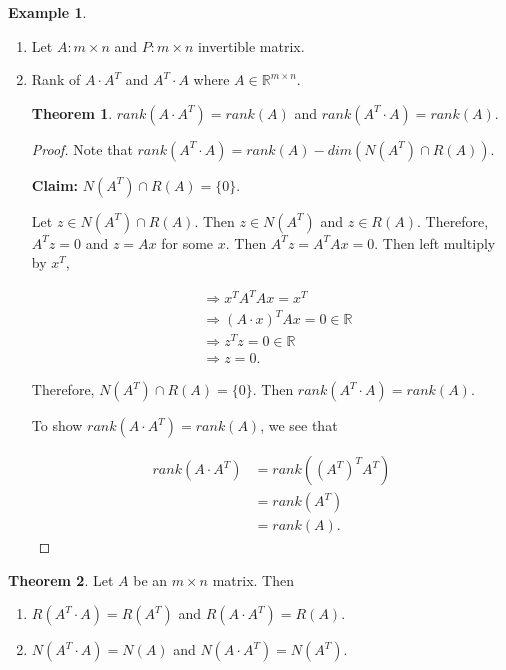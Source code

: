 \documentclass[12pt]{article}
\theoremstyle{definition}
\newtheorem*{example}{Example}
\newtheorem{theorem}{Theorem}[section]  %
\begin{document}
\begin{example} $ $
\begin{enumerate}[label = (\arabic*)]
\item Let $A: m \times n$ and $P: m \times n$ invertible matrix.


\item Rank of $A \cdot A^T$ and $A^T \cdot A$ where $A \in \mathbb{R}^{m \times n}$.

\begin{theorem}
$rank(A \cdot A^T) = rank(A)$ and $rank(A^T \cdot A) = rank(A)$.
\end{theorem}

\begin{proof}
Note that $rank(A^T \cdot A) = rank(A) - dim(N(A^T) \cap R(A))$.

\textbf{Claim:} $N(A^T) \cap R(A) = \{0\}$.

Let $z \in N(A^T) \cap R(A)$. Then $z \in N(A^T)$ and $z \in R(A)$. Therefore,
$A^Tz = 0$ and $z = Ax$ for some $x$. Then $A^T z = A^T Ax = 0$. Then left 
multiply by $x^T$,


\begin{align*}
&\Rightarrow x^T A^T A x = x^T \\
&\Rightarrow (A \cdot x)^T A x = 0 \in \mathbb{R} \\
&\Rightarrow z^Tz = 0 \in \mathbb{R} \\
&\Rightarrow z = 0.
\end{align*}

Therefore, $N(A^T) \cap R(A) = \{0\}$. Then $rank(A^T \cdot A) = rank(A)$.

To show $rank(A \cdot A^T) = rank(A)$, we see that

\begin{align*}
rank(A \cdot A^T) &= rank((A^T)^T A^T) \\
&= rank(A^T) \\
&= rank(A).
\end{align*}
\end{proof}

\end{enumerate}
\end{example}


\begin{theorem}
Let $A$ be an $m \times n$ matrix. Then

\begin{enumerate}[label = (\arabic*)]
\item $R(A^T \cdot A) = R(A^T)$ and $R(A \cdot A^T) = R(A)$.

\item $N(A^T \cdot A) = N(A)$ and $N(A \cdot A^T) = N(A^T)$.
\end{enumerate}
\end{theorem}
\end{document}
